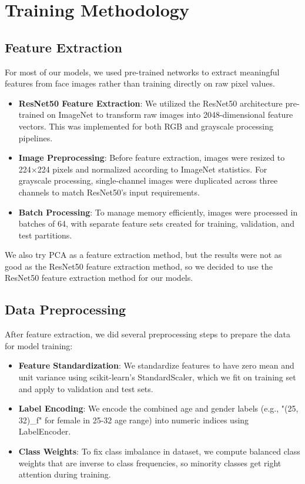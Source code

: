\documentclass{article}
\begin{document}
\newpage
\section{Training Methodology}

\subsection{Feature Extraction}

For most of our models, we used pre-trained networks to extract meaningful features from face images rather than training directly on raw pixel values.

\begin{itemize}
    \item \textbf{ResNet50 Feature Extraction}: We utilized the ResNet50 architecture pre-trained on ImageNet to transform raw images into 2048-dimensional feature vectors. This was implemented for both RGB and grayscale processing pipelines.
    
    \item \textbf{Image Preprocessing}: Before feature extraction, images were resized to 224×224 pixels and normalized according to ImageNet statistics. For grayscale processing, single-channel images were duplicated across three channels to match ResNet50's input requirements.
    
    \item \textbf{Batch Processing}: To manage memory efficiently, images were processed in batches of 64, with separate feature sets created for training, validation, and test partitions.
\end{itemize}

We also try PCA as a feature extraction method, but the results were not as good as the ResNet50 feature extraction method, so we decided to use the ResNet50 feature extraction method for our models.


\subsection{Data Preprocessing}
After feature extraction, we did several preprocessing steps to prepare the data for model training:

\begin{itemize}
    \item \textbf{Feature Standardization}: We standardize features to have zero mean and unit variance using scikit-learn's StandardScaler, which we fit on training set and apply to validation and test sets.
    
    \item \textbf{Label Encoding}: We encode the combined age and gender labels (e.g., "(25, 32)\_f" for female in 25-32 age range) into numeric indices using LabelEncoder.
    
    \item \textbf{Class Weights}: To fix class imbalance in dataset, we compute balanced class weights that are inverse to class frequencies, so minority classes get right attention during training.
\end{itemize}
\end{document}
